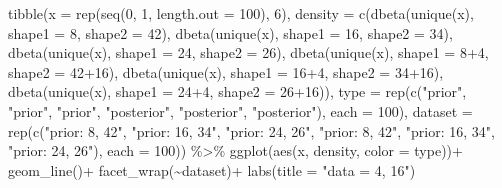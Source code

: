 \documentclass[
]{book}
\newenvironment{Shaded}{\begin{snugshade}}{\end{snugshade}}
\newcommand{\AttributeTok}[1]{\textcolor[rgb]{0.77,0.63,0.00}{#1}}
\newcommand{\DecValTok}[1]{\textcolor[rgb]{0.00,0.00,0.81}{#1}}
\newcommand{\FunctionTok}[1]{\textcolor[rgb]{0.00,0.00,0.00}{#1}}
\newcommand{\NormalTok}[1]{#1}
\newcommand{\SpecialCharTok}[1]{\textcolor[rgb]{0.00,0.00,0.00}{#1}}
\newcommand{\StringTok}[1]{\textcolor[rgb]{0.31,0.60,0.02}{#1}}
\begin{document}
\begin{Shaded}
\begin{Highlighting}[]
\FunctionTok{tibble}\NormalTok{(}\AttributeTok{x =} \FunctionTok{rep}\NormalTok{(}\FunctionTok{seq}\NormalTok{(}\DecValTok{0}\NormalTok{, }\DecValTok{1}\NormalTok{, }\AttributeTok{length.out =} \DecValTok{100}\NormalTok{), }\DecValTok{6}\NormalTok{),}
           \AttributeTok{density =} \FunctionTok{c}\NormalTok{(}\FunctionTok{dbeta}\NormalTok{(}\FunctionTok{unique}\NormalTok{(x), }\AttributeTok{shape1 =} \DecValTok{8}\NormalTok{, }\AttributeTok{shape2 =} \DecValTok{42}\NormalTok{),}
                       \FunctionTok{dbeta}\NormalTok{(}\FunctionTok{unique}\NormalTok{(x), }\AttributeTok{shape1 =} \DecValTok{16}\NormalTok{, }\AttributeTok{shape2 =} \DecValTok{34}\NormalTok{),}
                       \FunctionTok{dbeta}\NormalTok{(}\FunctionTok{unique}\NormalTok{(x), }\AttributeTok{shape1 =} \DecValTok{24}\NormalTok{, }\AttributeTok{shape2 =} \DecValTok{26}\NormalTok{),}
                       \FunctionTok{dbeta}\NormalTok{(}\FunctionTok{unique}\NormalTok{(x), }\AttributeTok{shape1 =} \DecValTok{8}\SpecialCharTok{+}\DecValTok{4}\NormalTok{, }\AttributeTok{shape2 =} \DecValTok{42}\SpecialCharTok{+}\DecValTok{16}\NormalTok{),}
                       \FunctionTok{dbeta}\NormalTok{(}\FunctionTok{unique}\NormalTok{(x), }\AttributeTok{shape1 =} \DecValTok{16}\SpecialCharTok{+}\DecValTok{4}\NormalTok{, }\AttributeTok{shape2 =} \DecValTok{34}\SpecialCharTok{+}\DecValTok{16}\NormalTok{),}
                       \FunctionTok{dbeta}\NormalTok{(}\FunctionTok{unique}\NormalTok{(x), }\AttributeTok{shape1 =} \DecValTok{24}\SpecialCharTok{+}\DecValTok{4}\NormalTok{, }\AttributeTok{shape2 =} \DecValTok{26}\SpecialCharTok{+}\DecValTok{16}\NormalTok{)),}
           \AttributeTok{type =} \FunctionTok{rep}\NormalTok{(}\FunctionTok{c}\NormalTok{(}\StringTok{"prior"}\NormalTok{, }\StringTok{"prior"}\NormalTok{, }\StringTok{"prior"}\NormalTok{, }\StringTok{"posterior"}\NormalTok{, }\StringTok{"posterior"}\NormalTok{, }\StringTok{"posterior"}\NormalTok{), }\AttributeTok{each =} \DecValTok{100}\NormalTok{),}
           \AttributeTok{dataset =} \FunctionTok{rep}\NormalTok{(}\FunctionTok{c}\NormalTok{(}\StringTok{"prior: 8, 42"}\NormalTok{, }\StringTok{"prior: 16, 34"}\NormalTok{, }\StringTok{"prior: 24, 26"}\NormalTok{,}
                           \StringTok{"prior: 8, 42"}\NormalTok{, }\StringTok{"prior: 16, 34"}\NormalTok{, }\StringTok{"prior: 24, 26"}\NormalTok{), }\AttributeTok{each =} \DecValTok{100}\NormalTok{)) }\SpecialCharTok{\%\textgreater{}\%} 
  \FunctionTok{ggplot}\NormalTok{(}\FunctionTok{aes}\NormalTok{(x, density, }\AttributeTok{color =}\NormalTok{ type))}\SpecialCharTok{+}
  \FunctionTok{geom\_line}\NormalTok{()}\SpecialCharTok{+}
  \FunctionTok{facet\_wrap}\NormalTok{(}\SpecialCharTok{\textasciitilde{}}\NormalTok{dataset)}\SpecialCharTok{+}
  \FunctionTok{labs}\NormalTok{(}\AttributeTok{title =} \StringTok{"data = 4, 16"}\NormalTok{)}
\end{Highlighting}
\end{Shaded}
\end{document}
